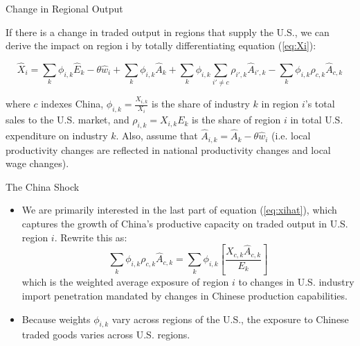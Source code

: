 \documentclass[aspectratio=169]{beamer}
\begin{document}
\begin{frame}{Change in Regional Output}

If there is a change in traded output in regions that supply the U.S., we can derive the impact on region i by totally differentiating equation (\ref{eq:Xi}):

\begin{equation}
    \hat{X}_{i} = \sum_{k} \phi_{i,k} \hat{E}_{k} - \theta \hat{w}_{i} + \sum_{k} \phi_{i,k} \hat{A}_{k} + \sum_{k} \phi_{i,k} \sum_{i' \neq c} \rho_{i',k} \hat{A}_{i',k} - \sum_{k} \phi_{i,k} \rho_{c,k} \hat{A}_{c,k}
    \label{eq:xihat}
\end{equation}

where $ c $ indexes China, $ \phi_{i,k} = \frac{X_{i,k}}{X_{i}} $ is the share of industry $ k $ in region $ i $’s total sales to the U.S. market, and $ \rho_{i,k} = X_{i,k} E_{k} $ is the share of region $ i $ in total U.S. expenditure on industry $ k $.  Also, assume that $ \hat{A}_{i,k} = \hat{A}_{k} - \theta \hat{w}_{i} $ (i.e. local productivity changes are reflected in national productivity changes and local wage changes). 
    
\end{frame}


\begin{frame}{The China Shock}

\begin{itemize}
    \item<1-> We are primarily interested in the last part of equation (\ref{eq:xihat}), which captures the growth of China’s productive capacity on traded output in U.S. region $ i $.  Rewrite this as:
    \begin{equation}
        \sum_{k} \phi_{i,k} \rho_{c,k} \hat{A}_{c,k} = \sum_{k} \phi_{i,k} \left[ \frac{X_{c,k} \hat{A}_{c,k}}{E_{k}} \right]
        \label{eq:Chinashock}
    \end{equation}
    which is the weighted average exposure of region $ i $ to changes in U.S. industry import penetration mandated by changes in Chinese production capabilities.
    \item<2-> Because weights $ \phi_{i,k} $ vary across regions of the U.S., the exposure to Chinese traded goods varies across U.S. regions.
\end{itemize}
    
\end{frame}
\end{document}

